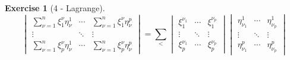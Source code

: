 \documentclass[letterpaper,12pt]{article}
\theoremstyle{definition}
\newtheorem*{exer}{Exercise}
\theoremstyle{remark}
\begin{document}
\begin{exer}[4 - Lagrange]
\[
\renewcommand{\arraystretch}{1.5}
\begin{vmatrix}
\sum_{\nu=1}^n\xi_1^{\nu}\eta^1_{\nu}&\cdots&\sum_{\nu=1}^n\xi_1^{\nu}\eta^p_{\nu}\\
\vdots&\ddots&\vdots\\
\sum_{\nu=1}^n\xi_p^{\nu}\eta^1_{\nu}&\cdots&\sum_{\nu=1}^n\xi_p^{\nu}\eta^p_{\nu}
\end{vmatrix}
=
\sum_{<}
\begin{vmatrix}
\xi_1^{\nu_1}&\cdots&\xi_1^{\nu_p}\\
\vdots&\ddots&\vdots\\
\xi_p^{\nu_1}&\cdots&\xi_p^{\nu_p}
\end{vmatrix}
\begin{vmatrix}
\eta^1_{\nu_1}&\cdots&\eta^1_{\nu_p}\\
\vdots&\ddots&\vdots\\
\eta^p_{\nu_1}&\cdots&\eta^p_{\nu_p}
\end{vmatrix}
\tag{1}\]
\end{exer}
\end{document}
